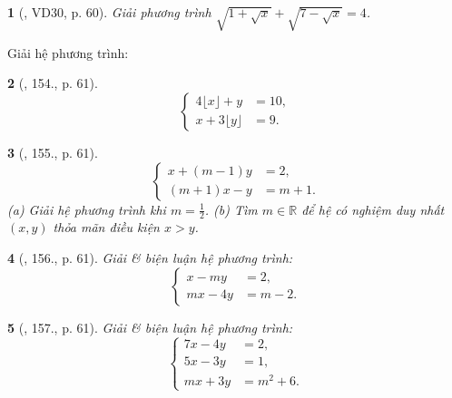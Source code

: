 \documentclass{article}
\newtheorem{baitoan}{}
\begin{document}
\begin{baitoan}[\cite{Tuyen_Toan_9_old}, VD30, p. 60]
	Giải phương trình $\sqrt{1 + \sqrt{x}} + \sqrt{7 - \sqrt{x}} = 4$.
\end{baitoan}
Giải hệ phương trình:

\begin{baitoan}[\cite{Tuyen_Toan_9_old}, 154., p. 61]
	\begin{equation*}
		\left\{\begin{split}
			4\lfloor x\rfloor + y &= 10,\\
			x + 3\lfloor y\rfloor &= 9.
		\end{split}\right.
	\end{equation*}
\end{baitoan}

\begin{baitoan}[\cite{Tuyen_Toan_9_old}, 155., p. 61]
	\begin{equation*}
		\left\{\begin{split}
			x + (m - 1)y &= 2,\\
			(m + 1)x - y &= m + 1.
		\end{split}\right.
	\end{equation*}
	(a) Giải hệ phương trình khi $m = \frac{1}{2}$. (b) Tìm $m\in\mathbb{R}$ để hệ có nghiệm duy nhất $(x,y)$ thỏa mãn điều kiện $x > y$.
\end{baitoan}

\begin{baitoan}[\cite{Tuyen_Toan_9_old}, 156., p. 61]
	Giải \& biện luận hệ phương trình:
	\begin{equation*}
		\left\{\begin{split}
			x - my &= 2,\\
			mx - 4y &= m - 2.
		\end{split}\right.
	\end{equation*}
\end{baitoan}

\begin{baitoan}[\cite{Tuyen_Toan_9_old}, 157., p. 61]
	Giải \& biện luận hệ phương trình:
	\begin{equation*}
		\left\{\begin{split}
			7x - 4y &= 2,\\
			5x - 3y &= 1,\\
			mx + 3y &= m^2 + 6.
		\end{split}\right.
	\end{equation*}
\end{baitoan}
\end{document}
